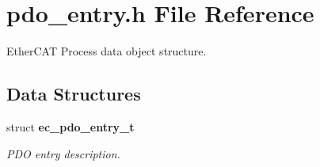 \section{pdo\-\_\-entry.\-h File Reference}
\label{pdo__entry_8h}


Ether\-C\-A\-T Process data object structure.  


\subsection*{Data Structures}
\begin{DoxyCompactItemize}
\item 
struct {\bf ec\-\_\-pdo\-\_\-entry\-\_\-t}
\begin{DoxyCompactList}\small\item\em P\-D\-O entry description. \end{DoxyCompactList}\end{DoxyCompactItemize}
